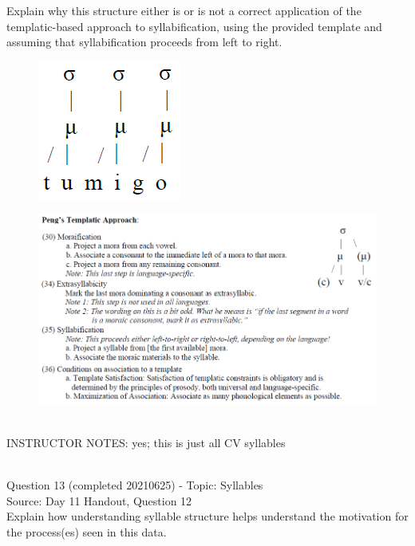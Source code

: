 \documentclass[12pt]{article}
\begin{document}
Explain why this structure either is or is not a correct application of the templatic-based approach to syllabification, using the provided template and assuming that syllabification proceeds from left to right.\\

\begin{figure}[H]
\includegraphics{../images/pengtemplate_tumigo_yes.png}
\end{figure}
\begin{figure}[H]
\includegraphics{../images/peng_template_withdiagram.png}
\end{figure}

~\\
INSTRUCTOR NOTES: yes; this is just all CV syllables


~\\

{\large Question 13} (completed 20210625) - Topic: Syllables\\
Source: Day 11 Handout, Question 12\\

Explain how understanding syllable structure helps understand the motivation for the process(es) seen in this data.\\
\end{document}
